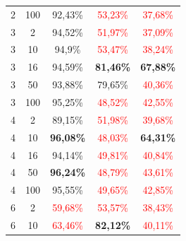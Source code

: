 \begin{table}[ht]
\begin{tabular}{cc|c|c|c}
        {2}                           & {100}     & {92,43\%}                           & \textcolor{red}{53,23\%}            & \textcolor{red}{37,68\%}                 \\
        {3}                           & {2}       & {94,52\%}                           & \textcolor{red}{51,97\%}            & \textcolor{red}{37,09\%}                 \\
        {3}                           & {10}      & {94,9\%}                            & \textcolor{red}{53,47\%}            & \textcolor{red}{38,24\%}                 \\
        {3}                           & {16}      & {94,59\%}                           & \textbf{81,46\%}                    & \textbf{67,88\%}                         \\
        {3}                           & {50}      & {93,88\%}                           & {79,65\%}                           & \textcolor{red}{40,36\%}                 \\
        {3}                           & {100}     & {95,25\%}                           & \textcolor{red}{48,52\%}            & \textcolor{red}{42,55\%}                 \\
        {4}                           & {2}       & {89,15\%}                           & \textcolor{red}{51,98\%}            & \textcolor{red}{39,68\%}                 \\
        {4}                           & {10}      & \textbf{96,08\%}                    & \textcolor{red}{48,03\%}            & \textbf{64,31\%}                         \\
        {4}                           & {16}      & {94,14\%}                           & \textcolor{red}{49,81\%}            & \textcolor{red}{40,84\%}                 \\
        {4}                           & {50}      & \textbf{96,24\%}                    & \textcolor{red}{48,79\%}            & \textcolor{red}{43,61\%}                 \\
        {4}                           & {100}     & {95,55\%}                           & \textcolor{red}{49,65\%}            & \textcolor{red}{42,85\%}                 \\
        {6}                           & {2}       & \textcolor{red}{59,68\%}            & \textcolor{red}{53,57\%}            & \textcolor{red}{38,43\%}                 \\
        {6}                           & {10}      & \textcolor{red}{63,46\%}            & \textbf{82,12\%}                    & \textcolor{red}{40,11\%}                 \\

\end{tabular}
\end{table}

